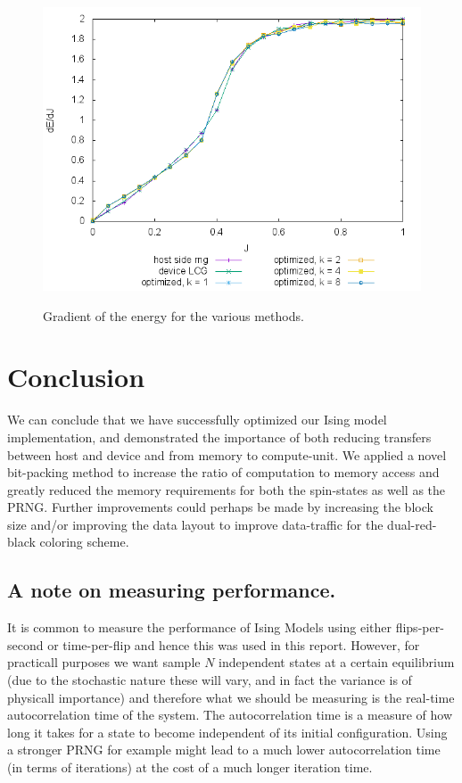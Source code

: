 \begin{figure}[!Hhp]
  \cenetring
  \includegraphics[width=\textwidth]{plots/MvJ.png}
  \label{fig:E}
  \caption{Gradient of the energy for the various methods.}
\end{figure}

\section{Conclusion}
We can conclude that we have successfully optimized our Ising model implementation, and demonstrated the importance of both reducing transfers between host and device and from memory to compute-unit. We applied a novel bit-packing method to increase the ratio of computation to memory access and
greatly reduced the memory requirements for both the spin-states as well as the PRNG. Further improvements could perhaps be made by increasing the block size and/or improving the data layout to improve data-traffic for the dual-red-black coloring scheme.
\begin{appendices}
  \section{A note on measuring performance.}
  It is common to measure the performance of Ising Models using either flips-per-second or time-per-flip and hence this was used in this report. However, for practicall purposes we want sample $N$ independent states at a certain equilibrium (due to the stochastic nature these will vary, and in fact
  the variance is of physicall importance) and therefore what we should be measuring is the real-time autocorrelation time of the system. The autocorrelation time is a measure of how long it takes for a state to become independent of its initial configuration. Using a stronger PRNG for example might
  lead to a much lower autocorrelation time (in terms of iterations) at the cost of a much longer iteration time.
\end{appendices}




